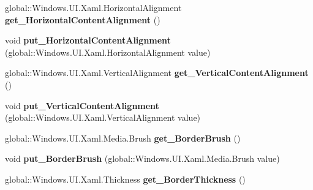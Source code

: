 \begin{DoxyCompactItemize}
global\+::\+Windows.\+U\+I.\+Xaml.\+Horizontal\+Alignment {\bfseries get\+\_\+\+Horizontal\+Content\+Alignment} ()
\item 
\mbox{\label{interface_windows_1_1_u_i_1_1_xaml_1_1_controls_1_1_i_content_presenter4_ae336a6680b3867b8c159d802caafbe13}} 
void {\bfseries put\+\_\+\+Horizontal\+Content\+Alignment} (global\+::\+Windows.\+U\+I.\+Xaml.\+Horizontal\+Alignment value)
\item 
\mbox{\label{interface_windows_1_1_u_i_1_1_xaml_1_1_controls_1_1_i_content_presenter4_acb36f5224b57a6975ff61aeee1ab5f74}} 
global\+::\+Windows.\+U\+I.\+Xaml.\+Vertical\+Alignment {\bfseries get\+\_\+\+Vertical\+Content\+Alignment} ()
\item 
\mbox{\label{interface_windows_1_1_u_i_1_1_xaml_1_1_controls_1_1_i_content_presenter4_adb058d58f1fe8cb9afcc0b94b026986c}} 
void {\bfseries put\+\_\+\+Vertical\+Content\+Alignment} (global\+::\+Windows.\+U\+I.\+Xaml.\+Vertical\+Alignment value)
\item 
\mbox{\label{interface_windows_1_1_u_i_1_1_xaml_1_1_controls_1_1_i_content_presenter4_ac7fd7fd864af0f81ad392923c67a8104}} 
global\+::\+Windows.\+U\+I.\+Xaml.\+Media.\+Brush {\bfseries get\+\_\+\+Border\+Brush} ()
\item 
\mbox{\label{interface_windows_1_1_u_i_1_1_xaml_1_1_controls_1_1_i_content_presenter4_a4bf1431ff8dce2bcdba162ef10e0f159}} 
void {\bfseries put\+\_\+\+Border\+Brush} (global\+::\+Windows.\+U\+I.\+Xaml.\+Media.\+Brush value)
\item 
\mbox{\label{interface_windows_1_1_u_i_1_1_xaml_1_1_controls_1_1_i_content_presenter4_aa8efa0fe881e1eb0b40490af2afb9d22}} 
global\+::\+Windows.\+U\+I.\+Xaml.\+Thickness {\bfseries get\+\_\+\+Border\+Thickness} ()
\item 
\mbox{\label{interface_windows_1_1_u_i_1_1_xaml_1_1_controls_1_1_i_content_presenter4_a29676ddecb0d27cd5443b81c5a6b1a68}} 

\end{DoxyCompactItemize}
